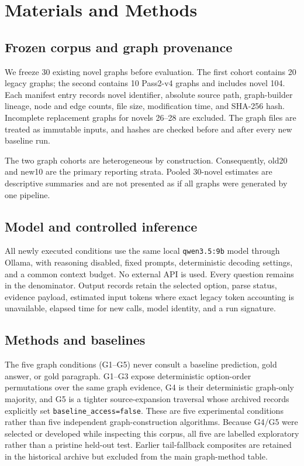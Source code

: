 \documentclass[11pt,a4paper]{article}
\begin{document}
\section{Materials and Methods}
\subsection{Frozen corpus and graph provenance}
We freeze 30 existing novel graphs before evaluation. The first cohort contains 20 legacy graphs; the second contains 10 Pass2-v4 graphs and includes novel 104. Each manifest entry records novel identifier, absolute source path, graph-builder lineage, node and edge counts, file size, modification time, and SHA-256 hash. Incomplete replacement graphs for novels 26--28 are excluded. The graph files are treated as immutable inputs, and hashes are checked before and after every new baseline run.

The two graph cohorts are heterogeneous by construction. Consequently, old20 and new10 are the primary reporting strata. Pooled 30-novel estimates are descriptive summaries and are not presented as if all graphs were generated by one pipeline.

\subsection{Model and controlled inference}
All newly executed conditions use the same local \texttt{qwen3.5:9b} model through Ollama, with reasoning disabled, fixed prompts, deterministic decoding settings, and a common context budget. No external API is used. Every question remains in the denominator. Output records retain the selected option, parse status, evidence payload, estimated input tokens where exact legacy token accounting is unavailable, elapsed time for new calls, model identity, and a run signature.

\subsection{Methods and baselines}
The five graph conditions (G1--G5) never consult a baseline prediction, gold answer, or gold paragraph. G1--G3 expose deterministic option-order permutations over the same graph evidence, G4 is their deterministic graph-only majority, and G5 is a tighter source-expansion traversal whose archived records explicitly set \texttt{baseline\_access=false}. These are five experimental conditions rather than five independent graph-construction algorithms. Because G4/G5 were selected or developed while inspecting this corpus, all five are labelled exploratory rather than a pristine held-out test. Earlier tail-fallback composites are retained in the historical archive but excluded from the main graph-method table.
\end{document}
